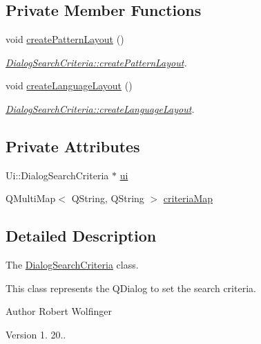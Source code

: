 \subsection*{Private Member Functions}
\begin{DoxyCompactItemize}
\item 
void \hyperlink{class_dialog_search_criteria_a0b4af6adf36d8fc7a4e6c7b29743e777}{create\+Pattern\+Layout} ()
\begin{DoxyCompactList}\small\item\em \hyperlink{class_dialog_search_criteria_a0b4af6adf36d8fc7a4e6c7b29743e777}{Dialog\+Search\+Criteria\+::create\+Pattern\+Layout}. \end{DoxyCompactList}\item 
void \hyperlink{class_dialog_search_criteria_adf3d7d1a2c6067edcb828f842cdb72ff}{create\+Language\+Layout} ()
\begin{DoxyCompactList}\small\item\em \hyperlink{class_dialog_search_criteria_adf3d7d1a2c6067edcb828f842cdb72ff}{Dialog\+Search\+Criteria\+::create\+Language\+Layout}. \end{DoxyCompactList}\end{DoxyCompactItemize}
\subsection*{Private Attributes}
\begin{DoxyCompactItemize}
\item 
Ui\+::\+Dialog\+Search\+Criteria $\ast$ \hyperlink{class_dialog_search_criteria_a7e7d05c4b1937aec851d514e19182c50}{ui}
\item 
Q\+Multi\+Map$<$ Q\+String, Q\+String $>$ \hyperlink{class_dialog_search_criteria_a3ed8b9ec17d79f4e995926e2ba7e02b4}{criteria\+Map}
\end{DoxyCompactItemize}


\subsection{Detailed Description}
The \hyperlink{class_dialog_search_criteria}{Dialog\+Search\+Criteria} class. 

This class represents the Q\+Dialog to set the search criteria.

\begin{DoxyAuthor}{Author}
Robert Wolfinger 
\end{DoxyAuthor}
\begin{DoxyVersion}{Version}
1. 20.. 
\end{DoxyVersion}


